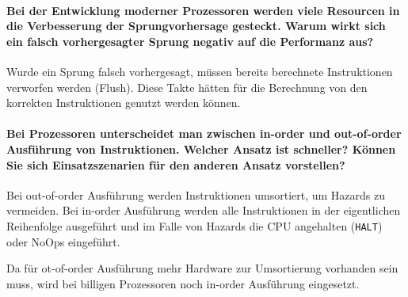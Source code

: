			\paragraph{Bei der Entwicklung moderner Prozessoren werden viele Resourcen in die Verbesserung der Sprungvorhersage gesteckt. Warum wirkt sich ein falsch vorhergesagter Sprung negativ auf die Performanz aus?}
				Wurde ein Sprung falsch vorhergesagt, müssen bereits berechnete Instruktionen verworfen werden (Flush). Diese Takte hätten für die Berechnung von den korrekten Instruktionen genutzt werden können.

			\paragraph{Bei Prozessoren unterscheidet man zwischen in-order und out-of-order Ausführung von Instruktionen. Welcher Ansatz ist schneller? Können Sie sich Einsatzszenarien für den anderen Ansatz vorstellen?}
				Bei out-of-order Ausführung werden Instruktionen umsortiert, um Hazards zu vermeiden. Bei in-order Ausführung werden alle Instruktionen in der eigentlichen Reihenfolge ausgeführt und im Falle von Hazards die CPU angehalten (\texttt{HALT}) oder NoOps eingeführt.

				Da für ot-of-order Ausführung mehr Hardware zur Umsortierung vorhanden sein muss, wird bei billigen Prozessoren noch in-order Ausführung eingesetzt.
